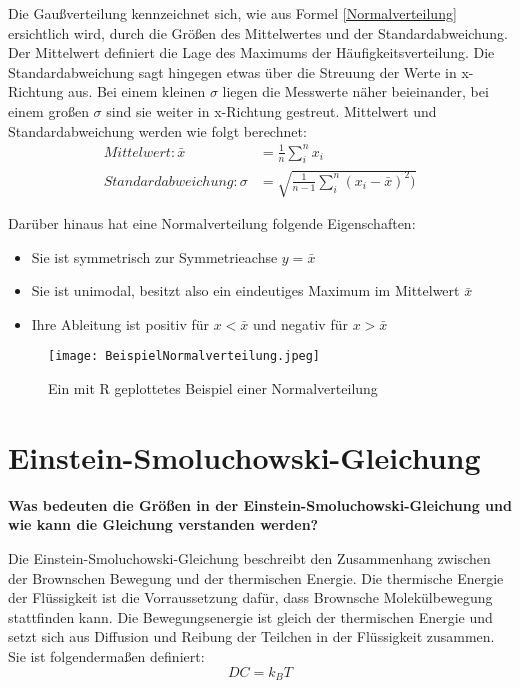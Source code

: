 \documentclass[a4paper, 12pt]{article}
\begin{document}
Die Gaußverteilung kennzeichnet sich, wie aus Formel \ref{Normalverteilung} ersichtlich wird, durch die Größen des Mittelwertes und der Standardabweichung. Der Mittelwert definiert die Lage des Maximums der Häufigkeitsverteilung. Die Standardabweichung sagt hingegen etwas über die Streuung der Werte in x-Richtung aus. Bei einem kleinen $\sigma$ liegen die Messwerte näher beieinander, bei einem großen $\sigma$ sind sie weiter in x-Richtung gestreut.  
Mittelwert und Standardabweichung werden wie folgt berechnet:
\begin{equation}
\begin{split}
Mittelwert: \bar{x} &= \frac{1}{n}\sum\limits_{i}^{n}x_i\\
Standardabweichung: \sigma &= \sqrt{\frac{1}{n-1}\sum\limits_{i}^{n}(x_i-\bar{x})^2)}
\end{split}
\end{equation}

Darüber hinaus hat eine Normalverteilung folgende Eigenschaften:
\begin{itemize}
\item{Sie ist symmetrisch zur Symmetrieachse $y=\bar{x}$}
\item{Sie ist unimodal, besitzt also ein eindeutiges Maximum im Mittelwert $\bar{x}$}
\item{Ihre Ableitung ist positiv für $x<\bar{x}$ und negativ für $x>\bar{x}$}
\end{itemize}

\begin{figure}[h]
\centering
\texttt{[image: BeispielNormalverteilung.jpeg]}
\caption{Ein mit R geplottetes Beispiel einer Normalverteilung}
\end{figure}

\section{Einstein-Smoluchowski-Gleichung}
\textbf{Was bedeuten die Größen in der Einstein-Smoluchowski-Gleichung und wie kann die
Gleichung verstanden werden?}

Die Einstein-Smoluchowski-Gleichung beschreibt den Zusammenhang zwischen der Brownschen Bewegung und der thermischen Energie. Die thermische Energie der Flüssigkeit ist die Vorraussetzung dafür, dass Brownsche Molekülbewegung stattfinden kann. Die Bewegungsenergie ist gleich der thermischen Energie und setzt sich aus Diffusion und Reibung der Teilchen in der Flüssigkeit zusammen. Sie ist folgendermaßen definiert:
\begin{equation}
DC=k_BT
\end{equation}
\end{document}
